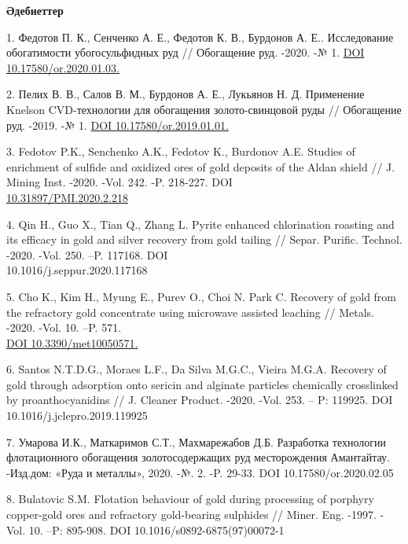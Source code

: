 \begin{center}
	{\bfseries Әдебиеттер}
\end{center}
	
\begin{references}
1. Федотов П. К., Сенченко А. Е., Федотов К. В., Бурдонов А. Е..
Исследование обогатимости убогосульфидных руд // Обогащение руд. -2020.
-№ 1. \href{https://doi.org/10.17580/or.2020.01.03}{DOI
10.17580/or.2020.01.03.}

2. Пелих В. В., Салов В. М., Бурдонов А. Е., Лукьянов Н. Д. Применение
Knelson CVD-технологии для обогащения золото-свинцовой руды //
Обогащение руд. -2019. -№ 1.
\href{https://doi.org/10.17580/or.2019.01.01}{DOI
10.17580/or.2019.01.01.}

3. Fedotov P.K., Senchenko A.K., Fedotov K., Burdonov A.E. Studies of
enrichment of sulfide and oxidized ores of gold deposits of the Aldan
shield // J. Mining Inst. -2020. -Vol. 242. -P. 218-227. DOI
\\\href{https://doi.org/10.31897/PMI.2020.2.218}{10.31897/PMI.2020.2.218}

4. Qin H., Guo X., Tian Q., Zhang L. Pyrite enhanced chlorination
roasting and its efficacy in gold and silver recovery from gold tailing
// Separ. Purific. Technol. -2020. -Vol. 250. --P. 117168. DOI
\\10.1016/j.seppur.2020.117168

5. Cho K., Kim H., Myung E., Purev O., Choi N. Park C. Recovery of gold
from the refractory gold concentrate using microwave assisted leaching
// Metals. -2020. -Vol. 10. --P. 571.
\\\href{https://doi.org/10.3390/met10050571}{DOI 10.3390/met10050571.}

6. Santos N.T.D.G., Moraes L.F., Da Silva M.G.C., Vieira M.G.A. Recovery
of gold through adsorption onto sericin and alginate particles
chemically crosslinked by proanthocyanidins // J. Cleaner Product.
-2020. -Vol. 253. -- P: 119925. DOI 10.1016/j.jclepro.2019.119925

7. Умарова И.К., Маткаримов С.Т., Махмарежабов Д.Б. Разработка
технологии флотационного обогащения золотосодержащих руд месторождения
Амантайтау. -Изд.дом: «Руда и металлы», 2020. -№. 2. -P. 29-33. DOI
10.17580/or.2020.02.05

8. Bulatovic S.M. Flotation behaviour of gold during processing of
porphyry copper-gold ores and refractory gold-bearing sulphides //
Miner. Eng. -1997. -Vol. 10. --P: 895-908. DOI
10.1016/s0892-6875(97)00072-1

\end{references}

